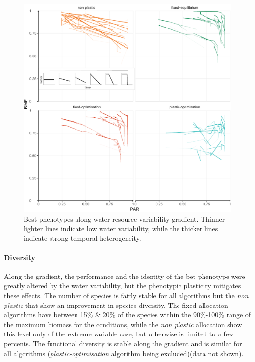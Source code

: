 \begin{figure}\label{fig:variable_trajectories}
\includegraphics[width = \textwidth]{./2_PP/Figures/Variable/var_2D_strat_dyn.pdf}
\caption[Best phenotypes along water resource variability gradient]{Best phenotypes along water resource variability gradient. Thinner lighter lines indicate low water variability, while the thicker lines indicate strong temporal heterogeneity.}
\end{figure}

\paragraph{Diversity}



Along the gradient, the performance and the identity of the bet phenotype were greatly altered by the water variability, but the phenotypic plasticity mitigates these effects. The number of species is fairly stable for all algorithms but the \textit{non plastic} that show an improvement in species diversity. The fixed allocation algorithms have between 15\% \& 20\% of the species within the 90\%-100\% range of the maximum biomass for the conditions, while the \textit{non plastic} allocation show this level only of the extreme variable case, but otherwise is limited to a few percents. The functional diversity is stable along the gradient and is similar for all algorithms (\textit{plastic-optimisation} algorithm being excluded)(data not shown).

